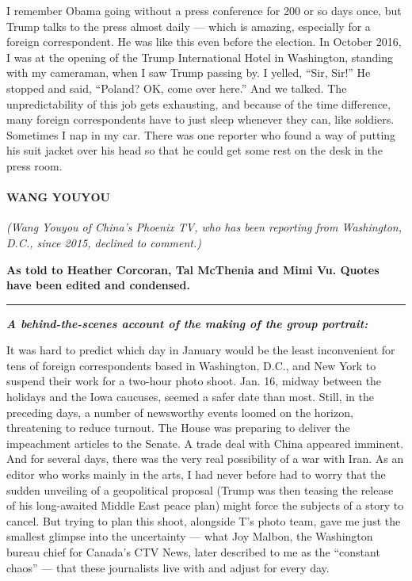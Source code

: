 I remember Obama going without a press conference for 200 or so days
once, but Trump talks to the press almost daily --- which is amazing,
especially for a foreign correspondent. He was like this even before the
election. In October 2016, I was at the opening of the Trump
International Hotel in Washington, standing with my cameraman, when I
saw Trump passing by. I yelled, ``Sir, Sir!'' He stopped and said,
``Poland? OK, come over here.'' And we talked. The unpredictability of
this job gets exhausting, and because of the time difference, many
foreign correspondents have to just sleep whenever they can, like
soldiers. Sometimes I nap in my car. There was one reporter who found a
way of putting his suit jacket over his head so that he could get some
rest on the desk in the press room.

\hypertarget{wang-youyou}{%
\paragraph{WANG YOUYOU}\label{wang-youyou}}

\emph{(Wang Youyou of China's Phoenix TV, who has been reporting from
Washington, D.C., since 2015, declined to comment.)}

\textbf{As told to Heather Corcoran, Tal McThenia and Mimi Vu. Quotes
have been edited and condensed.}

\begin{center}\rule{0.5\linewidth}{\linethickness}\end{center}

\emph{\textbf{A behind-the-scenes account of the making of the group
portrait:}}

It was hard to predict which day in January would be the least
inconvenient for tens of foreign correspondents based in Washington,
D.C., and New York to suspend their work for a two-hour photo shoot.
Jan. 16, midway between the holidays and the Iowa caucuses, seemed a
safer date than most. Still, in the preceding days, a number of
newsworthy events loomed on the horizon, threatening to reduce turnout.
The House was preparing to deliver the impeachment articles to the
Senate. A trade deal with China appeared imminent. And for several days,
there was the very real possibility of a war with Iran. As an editor who
works mainly in the arts, I had never before had to worry that the
sudden unveiling of a geopolitical proposal (Trump was then teasing the
release of his long-awaited Middle East peace plan) might force the
subjects of a story to cancel. But trying to plan this shoot, alongside
T's photo team, gave me just the smallest glimpse into the uncertainty
--- what Joy Malbon, the Washington bureau chief for Canada's CTV News,
later described to me as the ``constant chaos'' --- that these
journalists live with and adjust for every day.

